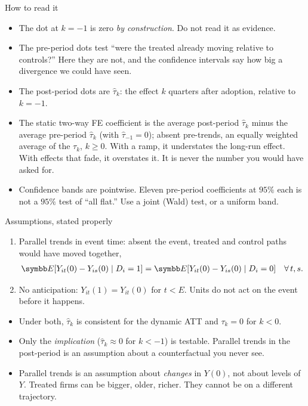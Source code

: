 \documentclass[aspectratio=169,11pt]{beamer}
\begin{document}
\begin{frame}{How to read it}
\begin{itemize}
	\item The dot at $k = -1$ is zero \emph{by construction}. Do not read it as evidence.
	\medskip
	\item The pre-period dots test ``were the treated already moving relative to controls?'' Here
	they are not, and the confidence intervals say how big a divergence we could have seen.
	\medskip
	\item The post-period dots are $\hat\tau_k$: the effect $k$ quarters after adoption, relative to
	$k = -1$.
	\medskip
	\item The static two-way FE coefficient is the average post-period $\hat\tau_k$ minus the average pre-period
	$\hat\tau_k$ (with $\hat\tau_{-1}=0$); absent pre-trends, an equally weighted average of the $\tau_k$, $k \ge 0$. With a ramp, it understates
	the long-run effect. With effects that fade, it overstates it. It is never the number you
	would have asked for.
	\medskip
	\item Confidence bands are pointwise. Eleven pre-period coefficients at $95\%$ each is not a
	$95\%$ test of ``all flat.'' Use a joint (Wald) test, or a uniform band.
\end{itemize}
\end{frame}


\begin{frame}{Assumptions, stated properly}
\begin{enumerate}
	\item \alert{Parallel trends} in event time: absent the event, treated and control paths would
	have moved together,
	\begin{align*}
		\E[Y_{it}(0) - Y_{is}(0) \mid D_i = 1] = \E[Y_{it}(0) - Y_{is}(0) \mid D_i = 0] \quad \forall\, t, s .
	\end{align*}
	\medskip
	\item \alert{No anticipation}: $Y_{it}(1) = Y_{it}(0)$ for $t < E$. Units do not act on the
	event before it happens.
\end{enumerate}
\medskip
\begin{itemize}
	\item Under both, $\hat\tau_k$ is consistent for the dynamic ATT and $\tau_k = 0$ for $k < 0$.
	\medskip
	\item Only the \emph{implication} ($\hat\tau_k \approx 0$ for $k < -1$) is testable. Parallel
	trends in the post-period is an assumption about a counterfactual you never see.
	\medskip
	\item Parallel trends is an assumption about \emph{changes} in $Y(0)$, not about levels of $Y$.
	Treated firms can be bigger, older, richer. They cannot be on a different trajectory.
\end{itemize}
\end{frame}
\end{document}
